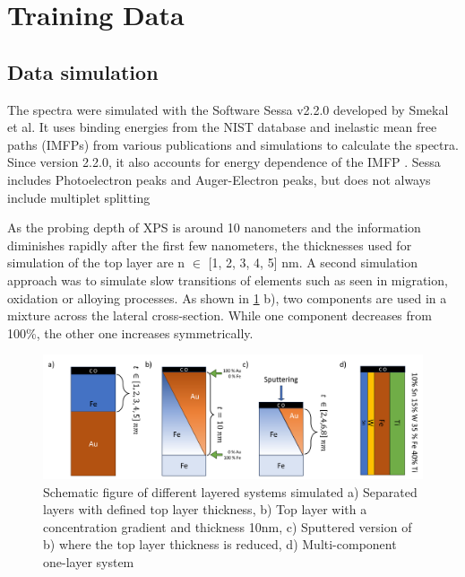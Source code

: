 

\section{Training Data}
\label{train_data}


\subsection{Data simulation}

The spectra were simulated with the Software Sessa v2.2.0 developed by Smekal et al. It uses binding energies from the NIST database and inelastic mean free paths (IMFPs) from various publications and simulations to calculate the spectra. Since version 2.2.0, it also accounts for energy dependence of the IMFP \cite{noauthor_nist_2010}.
Sessa includes Photoelectron peaks and Auger-Electron peaks, but does not always include multiplet splitting 

As the probing depth of XPS is around 10 nanometers and the information diminishes rapidly after the first few nanometers, the thicknesses used for simulation of the top layer are n $\in$ [1, 2, 3, 4, 5] nm. A second simulation approach was to simulate slow transitions of elements such as seen in migration, oxidation or alloying processes. As shown in \ref{fig:layers} b), two components are used in a mixture across the lateral cross-section. While one component decreases from 100\%, the other one increases symmetrically.

\begin{figure}
    \centering
    \includegraphics[width=\textwidth]{Figures/layers.png}
    \caption{Schematic figure of different layered systems simulated a) Separated layers with defined top layer thickness, b) Top layer with a concentration gradient and thickness 10nm, c) Sputtered version of b) where the top layer thickness is reduced, d) Multi-component one-layer system}
    \label{fig:layers}
\end{figure}


